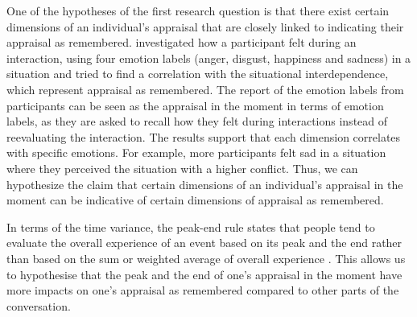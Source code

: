 One of the hypotheses of the first research question is that there exist certain dimensions of an individual's appraisal that are closely linked to indicating their appraisal as remembered. \citeauthor{gerpott2017howdopeople} \cite{gerpott2017howdopeople} investigated how a participant felt during an interaction, using four emotion labels (anger, disgust, happiness and sadness) in a situation and tried to find a correlation with the situational interdependence, which represent appraisal as remembered. The report of the emotion labels from participants can be seen as the appraisal in the moment in terms of emotion labels, as they are asked to recall how they felt during interactions instead of reevaluating the interaction. The results support that each dimension correlates with specific emotions. For example, more participants felt sad in a situation where they perceived the situation with a higher conflict. Thus, we can hypothesize the claim that certain dimensions of an individual's appraisal in the moment can be indicative of certain dimensions of appraisal as remembered. 

In terms of the time variance, the peak-end rule states that people tend to evaluate the overall experience of an event based on its peak and the end rather than based on the sum or weighted average of overall experience \cite{kahneman2000evaluation}. This allows us to hypothesise that the peak and the end of one's appraisal in the moment have more impacts on one's appraisal as remembered compared to other parts of the conversation. 


